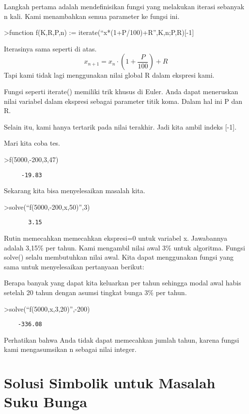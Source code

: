 \documentclass[
]{book}
\begin{document}
Langkah pertama adalah mendefinisikan fungsi yang melakukan iterasi sebanyak n kali. Kami menambahkan semua parameter ke fungsi ini.

\textgreater function f(K,R,P,n) := iterate(``x*(1+P/100)+R'',K,n;P,R){[}-1{]}

Iterasinya sama seperti di atas. \[x_{n+1} = x_n \cdot \left(1+ \frac{P}{100}\right) + R\] Tapi kami tidak lagi menggunakan nilai global R dalam ekspresi kami.

Fungsi seperti iterate() memiliki trik khusus di Euler. Anda dapat meneruskan nilai variabel dalam ekspresi sebagai parameter titik koma. Dalam hal ini P dan R.

Selain itu, kami hanya tertarik pada nilai terakhir. Jadi kita ambil indeks {[}-1{]}.

Mari kita coba tes.

\textgreater f(5000,-200,3,47)

\begin{verbatim}
     -19.83 
\end{verbatim}

Sekarang kita bisa menyelesaikan masalah kita.

\textgreater solve(``f(5000,-200,x,50)'',3)

\begin{verbatim}
       3.15 
\end{verbatim}

Rutin memecahkan memecahkan ekspresi=0 untuk variabel x. Jawabannya adalah 3,15\% per tahun. Kami mengambil nilai awal 3\% untuk algoritma. Fungsi solve() selalu membutuhkan nilai awal. Kita dapat menggunakan fungsi yang sama untuk menyelesaikan pertanyaan berikut:

Berapa banyak yang dapat kita keluarkan per tahun sehingga modal awal habis setelah 20 tahun dengan asumsi tingkat bunga 3\% per tahun.

\textgreater solve(``f(5000,x,3,20)'',-200)

\begin{verbatim}
    -336.08 
\end{verbatim}

Perhatikan bahwa Anda tidak dapat memecahkan jumlah tahun, karena fungsi kami mengasumsikan n sebagai nilai integer.

\chapter{Solusi Simbolik untuk Masalah Suku Bunga}\label{solusi-simbolik-untuk-masalah-suku-bunga}
\end{document}

